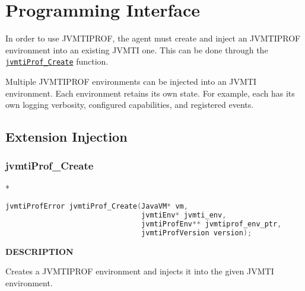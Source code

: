 


\section{Programming Interface} \label{sec:api}

In order to use JVMTIPROF, the agent must create and inject an JVMTIPROF environment into an existing JVMTI one. This can be done through the \hyperref[api:jvmtiProf_Create]{\texttt{jvmtiProf\_Create}} function.

Multiple JVMTIPROF environments can be injected into an JVMTI environment. Each environment retains its own state. For example, each has its own logging verbosity, configured capabilities, and registered events.





\subsection{Extension Injection}


\subsubsection*{jvmtiProf\_Create} \label{api:jvmtiProf_Create} *

\bigskip
\begin{lstlisting}[language=C++]
jvmtiProfError jvmtiProf_Create(JavaVM* vm,
                                jvmtiEnv* jvmti_env,
                                jvmtiProfEnv** jvmtiprof_env_ptr,
                                jvmtiProfVersion version);
\end{lstlisting}

\bigskip
\noindent \textbf{DESCRIPTION}

Creates a JVMTIPROF environment and injects it into the given JVMTI environment.

